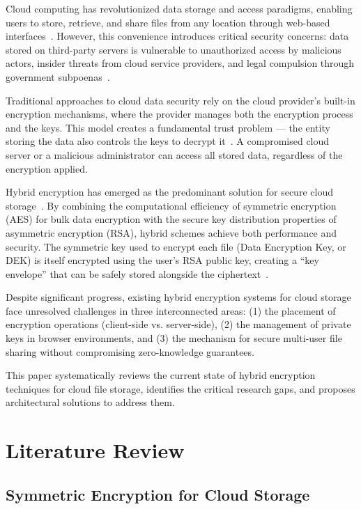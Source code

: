 \documentclass[conference]{IEEEtran}
\begin{document}
Cloud computing has revolutionized data storage and access paradigms, enabling users to store, retrieve, and share files from any location through web-based interfaces~\cite{mell2011nist}. However, this convenience introduces critical security concerns: data stored on third-party servers is vulnerable to unauthorized access by malicious actors, insider threats from cloud service providers, and legal compulsion through government subpoenas~\cite{chen2012data}.

Traditional approaches to cloud data security rely on the cloud provider's built-in encryption mechanisms, where the provider manages both the encryption process and the keys. This model creates a fundamental trust problem --- the entity storing the data also controls the keys to decrypt it~\cite{kamara2010cryptographic}. A compromised cloud server or a malicious administrator can access all stored data, regardless of the encryption applied.

Hybrid encryption has emerged as the predominant solution for secure cloud storage~\cite{singh2023hybrid}. By combining the computational efficiency of symmetric encryption (AES) for bulk data encryption with the secure key distribution properties of asymmetric encryption (RSA), hybrid schemes achieve both performance and security. The symmetric key used to encrypt each file (Data Encryption Key, or DEK) is itself encrypted using the user's RSA public key, creating a ``key envelope'' that can be safely stored alongside the ciphertext~\cite{barker2020recommendation}.

Despite significant progress, existing hybrid encryption systems for cloud storage face unresolved challenges in three interconnected areas: (1) the placement of encryption operations (client-side vs. server-side), (2) the management of private keys in browser environments, and (3) the mechanism for secure multi-user file sharing without compromising zero-knowledge guarantees.

This paper systematically reviews the current state of hybrid encryption techniques for cloud file storage, identifies the critical research gaps, and proposes architectural solutions to address them.

\section{Literature Review}

\subsection{Symmetric Encryption for Cloud Storage}
\end{document}
